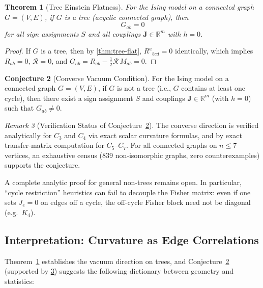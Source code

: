\documentclass[11pt]{article}
\newtheorem{theorem}{Theorem}[section]
\theoremstyle{definition}
\newtheorem{conjecture}[theorem]{Conjecture}
\theoremstyle{remark}
\newtheorem{remark}[theorem]{Remark}
\newcommand{\sgn}{S}
\newcommand{\Met}{M}
\newcommand{\coupl}{\mathbf{J}}
\newcommand{\Ein}{G}
\newcommand{\Ric}{R}
\newcommand{\Scal}{\mathcal{R}}
\begin{document}
\begin{theorem}[Tree Einstein Flatness]
\label{thm:vacuum}
For the Ising model on a connected graph $G = (V, E)$, if $G$ is a tree
(acyclic connected graph), then
\[
  \Ein_{ab} = 0
\]
for all sign assignments $\sgn$ and all couplings $\coupl \in \mathbb{R}^m$
with $h = 0$.
\end{theorem}

\begin{proof}
If $G$ is a tree, then by \cref{thm:tree-flat}, $\Ric^a{}_{bcd} = 0$
identically, which implies $\Ric_{ab} = 0$, $\Scal = 0$, and
$\Ein_{ab} = \Ric_{ab} - \frac{1}{2}\Scal\,\Met_{ab} = 0$.
\end{proof}

\begin{conjecture}[Converse Vacuum Condition]
\label{conj:vacuum-converse}
For the Ising model on a connected graph $G = (V, E)$, if $G$ is not a
tree (i.e., $G$ contains at least one cycle), then there exist a sign
assignment $\sgn$ and couplings $\coupl \in \mathbb{R}^m$ (with $h = 0$)
such that $\Ein_{ab} \neq 0$.
\end{conjecture}

\begin{remark}[Verification Status of Conjecture~\ref{conj:vacuum-converse}]
\label{rem:vacuum-proof-status}
The converse direction is verified analytically for $C_3$ and $C_4$ via
exact scalar curvature formulas, and by exact transfer-matrix computation
for $C_5$--$C_7$.
For all connected graphs on $n \leq 7$ vertices, an exhaustive census
($839$ non-isomorphic graphs, zero counterexamples) supports the conjecture.

A complete analytic proof for general non-trees remains open. In particular,
``cycle restriction'' heuristics can fail to decouple the Fisher matrix:
even if one sets $J_e = 0$ on edges off a cycle, the off-cycle Fisher block
need not be diagonal (e.g.\ $K_4$).
\end{remark}

\subsection{Interpretation: Curvature as Edge Correlations}

Theorem~\ref{thm:vacuum} establishes the vacuum direction on trees, and
Conjecture~\ref{conj:vacuum-converse} (supported by \cref{rem:vacuum-proof-status})
suggests the following dictionary between geometry and statistics:
\end{document}
